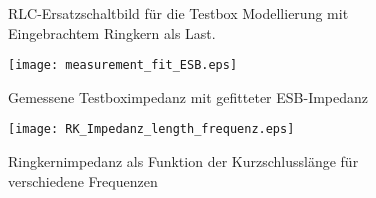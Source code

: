\par

\begin{figure}[htb]
\centering
{}
\caption{RLC-Ersatzschaltbild f\"ur die Testbox Modellierung mit Eingebrachtem Ringkern als Last.}
\end{figure}

\begin{figure}[htb]
	\centering
	\texttt{[image: measurement\_fit\_ESB.eps]}
	\caption{Gemessene Testboximpedanz mit gefitteter ESB-Impedanz}
	\label{fig:testboxfit}
\end{figure}

\begin{figure}[htb]
	\centering
	\texttt{[image: RK\_Impedanz\_length\_frequenz.eps]}
	\caption{Ringkernimpedanz als Funktion der Kurzschlussl\"ange f\"ur verschiedene Frequenzen}
	\label{fig:testboxfit}
\end{figure}
